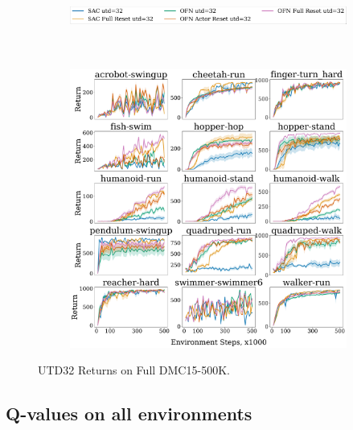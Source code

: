 \newpage

\begin{figure}[H]
\centering
    \begin{subfigure}[b]{0.8\textwidth}
        \centering
        \includegraphics[height=0.8cm]{figures/dissecting/main_exp/utd_32_return_legend.pdf}
    \end{subfigure}\\%
    \begin{subfigure}[b]{1\textwidth}
        \centering
        \includegraphics[width=15cm, trim=0cm 0cm 0cm 0cm ,clip]{figures/dissecting/main_exp/utd_32_return.pdf}
    \end{subfigure}%
    \vspace{-5pt}
    \caption{UTD32 Returns on Full DMC15-500K.}
    \label{fig:utd32_ret}
\end{figure}

\newpage

\subsection{Q-values on all environments} \label{app:exp_q}

